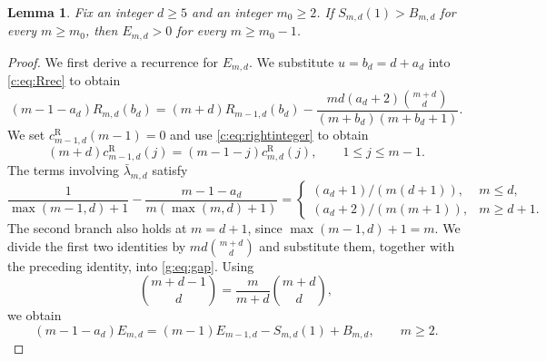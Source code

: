 \documentclass[11pt]{article}
\numberwithin{equation}{section}
\newtheorem{lemma}[theorem]{Lemma}
\theoremstyle{remark}\newtheorem{remark}[theorem]{Remark}
\begin{document}
\begin{lemma}\label{g:lem:tail}
Fix an integer $d\ge5$ and an integer $m_0\ge2$.
If $S_{m,d}(1)>B_{m,d}$ for every $m\ge m_0$, then
$E_{m,d}>0$ for every $m\ge m_0-1$.
\end{lemma}
\begin{proof}
We first derive a recurrence for $E_{m,d}$. We substitute $u=b_d=d+a_d$
into \eqref{c:eq:Rrec} to obtain
\[
 (m-1-a_d)R_{m,d}(b_d)=(m+d)R_{m-1,d}(b_d)
 -\frac{md(a_d+2)\binom{m+d}{d}}{(m+b_d)(m+b_d+1)}.
\]
We set $c_{m-1,d}^{\mathrm R}(m-1)=0$ and use
\eqref{c:eq:rightinteger} to obtain
\[
 (m+d)c_{m-1,d}^{\mathrm R}(j)
 =(m-1-j)c_{m,d}^{\mathrm R}(j),\qquad1\le j\le m-1.
\]
The terms involving $\bar\lambda_{m,d}$ satisfy
\[
 \frac1{\max(m-1,d)+1}
 -\frac{m-1-a_d}{m(\max(m,d)+1)}
 =
 \begin{cases}
 (a_d+1)/(m(d+1)),&m\le d,\\
 (a_d+2)/(m(m+1)),&m\ge d+1.
 \end{cases}
\]
The second branch also holds at $m=d+1$, since
$\max(m-1,d)+1=m$.
We divide the first two identities by $md\binom{m+d}{d}$ and
substitute them, together with the preceding identity,
into \eqref{g:eq:gap}. Using
\[
 \binom{m+d-1}{d}=\frac{m}{m+d}\binom{m+d}{d},
\]
we obtain
\begin{equation}\label{g:eq:backward}
 (m-1-a_d)E_{m,d}=(m-1)E_{m-1,d}-S_{m,d}(1)+B_{m,d},
 \qquad m\ge2.
\end{equation}


\end{proof}
\end{document}
